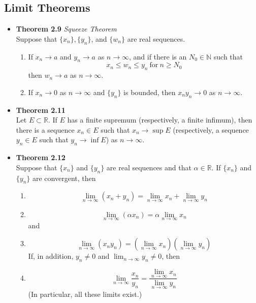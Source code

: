 \documentclass[11pt,a4paper]{article}
\begin{document}
\subsection{Limit Theorems}

\begin{itemize}
    \item \textbf{Theorem 2.9} \emph{Squeeze Theorem} \\
        Suppose that $\{x_n\}, \{y_n\}$, and $\{w_n\}$ are real sequences.
        \begin{enumerate}
            \item If $x_n \to a$ and $y_n \to a$ as $n \to \infty$,
                and if there is an $N_0 \in \mathbb{N}$ such that
                \[
                    x_n \leq w_n \leq y_n \ \text{for} \ n \geq N_0
                \]
                then $w_n \to a$ as $n \to \infty$.
            \item If $x_n \to 0$ as $n \to \infty$ and $\{y_n\}$ is bounded,
                then $x_n y_n \to 0$ as $n \to \infty$.
        \end{enumerate}

    \item \textbf{Theorem 2.11} \\
        Let $E \subset \mathbb{R}$.
        If $E$ has a finite supremum (respectively, a finite infimum),
        then there is a sequence $x_n \in E$ such that $x_n \to \sup E$
        (respectively, a sequence $y_n \in E$ such that $y_n \to \inf E$)
        as $n \to \infty$.

    \item \textbf{Theorem 2.12} \\
        Suppose that $\{x_n\}$ and $\{y_n\}$ are real sequences and that $\alpha \in \mathbb{R}$.
        If $\{x_n\}$ and $\{y_n\}$ are convergent, then
        \begin{enumerate}
            \item
                \[
                    \lim_{n \to \infty} (x_n + y_n) =
                    \lim_{n \to \infty} x_n + \lim_{n \to \infty} y_n
                \]
            \item
                \[
                    \lim_{n \to \infty} (\alpha x_n) = \alpha \lim_{n \to \infty} x_n
                \]
                and
            \item
                \[
                    \lim_{n \to \infty} (x_n y_n) =
                    ( \lim_{n \to \infty} x_n ) (\lim_{n \to \infty} y_n)
                \]
                If, in addition, $y_n \neq 0$ and $\lim_{n \to \infty} y_n \neq 0$, then
            \item
                \[
                    \lim_{n \to \infty} \frac{x_n}{y_n} =
                    \frac{\lim_{n \to \infty} x_n}{\lim_{n \to \infty} y_n}
                \]
                (In particular, all these limits exist.)


\end{enumerate}
\end{itemize}
\end{document}
